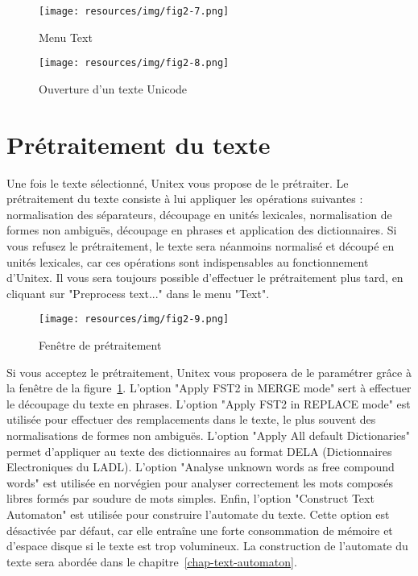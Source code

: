 \begin{figure}[!ht]
\begin{center}
\texttt{[image: resources/img/fig2-7.png]}
\caption{Menu Text}
\end{center}
\end{figure}

\begin{figure}[!ht]
\begin{center}
\texttt{[image: resources/img/fig2-8.png]}
\caption{Ouverture d’un texte Unicode}
\end{center}
\end{figure}



\section{Prétraitement du texte}
\noindent Une fois le texte sélectionné, Unitex vous propose de le prétraiter. Le prétraitement du
texte consiste à lui appliquer les opérations suivantes : normalisation des séparateurs, 
découpage en unités lexicales, normalisation de formes non ambiguës, découpage en phrases
et application des dictionnaires. Si vous refusez le prétraitement, le texte sera néanmoins
normalisé et découpé en unités lexicales, car ces opérations sont indispensables au
fonctionnement d’Unitex. Il vous sera toujours possible d’effectuer le prétraitement plus tard,
en cliquant sur "Preprocess text..." dans le menu "Text".


\begin{figure}[!ht]
\begin{center}
\texttt{[image: resources/img/fig2-9.png]}
\caption{Fenêtre de prétraitement\label{fig-preprocessing-frame}}
\end{center}
\end{figure}

\bigskip
\noindent 
Si vous acceptez le prétraitement, Unitex vous proposera de le paramétrer grâce à la fenêtre de la
figure~\ref{fig-preprocessing-frame}. L’option "Apply FST2 in MERGE mode" sert à effectuer le
découpage du texte en phrases. L’option "Apply FST2 in REPLACE mode" est utilisée pour effectuer des
remplacements dans le texte, le plus souvent des normalisations de formes non ambiguës. L’option
"Apply All default Dictionaries" permet d’appliquer au texte des dictionnaires au format DELA
(Dictionnaires Electroniques du LADL).  L’option "Analyse unknown words as free 
compound words" est utilisée en norvégien pour analyser correctement les mots composés libres
formés par soudure de mots simples. Enfin, l’option "Construct Text Automaton" est utilisée
pour construire l’automate du texte. Cette option est désactivée par défaut, car elle entraîne
une forte consommation de mémoire et d’espace disque si le texte est trop volumineux. La
construction de l’automate du texte sera abordée dans le chapitre~\ref{chap-text-automaton}.


